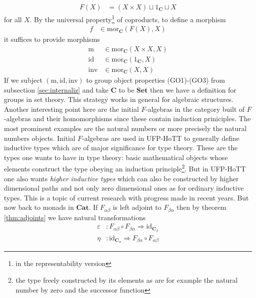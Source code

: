 \begin{align*}
  F(X)
  &=
  \left(
    X
    \times
    X
  \right)
  \sqcup
  1_{\mathbf{C}}
  \sqcup
  X
\end{align*}
for all $X$. By the universal property\footnote{in the representability version} of coproducts, to define a morphism
\begin{align*}
  f
  &\in
  \mathrm{mor}_{\mathbf{C}}(F(X),X)
\end{align*}
it suffices to provide morphisms
\begin{align*}
  \mathrm{m}
  &\in
  \mathrm{mor}_{\mathbf{C}}(X \times X,X)
  \\
  \mathrm{id}
  &\in
  \mathrm{mor}_{\mathbf{C}}(1_{\mathbf{C}},X)
  \\
  \mathrm{inv}
  &\in
  \mathrm{mor}_{\mathbf{C}}(X,X)
\end{align*}
If we subject $(\mathrm{m},\mathrm{id},\mathrm{inv})$ to group object properties (GO1)-(GO3) from subsection \ref{sec:internaliz} and take $\mathbf{C}$ to be $\mathbf{Set}$ then we have a definition for groups in set theory. This strategy works in general for algebraic structures. Another interesting point here are the initial $F$-algebras in the category built of $F$-algebras and their homomorphisms since these contain induction priniciples. The most prominent examples are the natural numbers or more precisely the natural numbers objects. Initial $F$-algebras are used in UFP-HoTT to generally define inductive types which are of major significance for type theory. These are the types one wants to have in type theory: basic mathematical objects whose elements construct the type obeying an induction principle\footnote{the type freely constructed by its elements as are for example the natural number by zero and the successor function}. But in UFP-HoTT one also wants \textit{higher inductive types} which can also be constructed by higher dimensional paths and not only zero dimensional ones as for ordinary inductive types. This is a topic of current research with progress made in recent years. But now back to monads in $\mathbf{Cat}$. If $F_{\alpha\beta}$ is left adjoint to $F_{\beta\alpha}$ then by theorem \ref{thm:adjoints} we have natural transformations
\begin{align*}
  \varepsilon
  &\colon
  F_{\alpha\beta}
  \circ
  F_{\beta\alpha}
  \Rightarrow
  \mathrm{id}_{\mathbf{C}_{\beta}}
  \\
  \eta
  &\colon
  \mathrm{id}_{\mathbf{C}_{\alpha}}
  \Rightarrow
  F_{\beta\alpha}
  \circ
  F_{\alpha\beta}
\end{align*}
